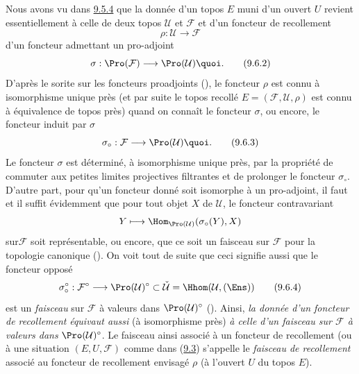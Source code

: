 Nous avons vu dans \hyperref[IV.theo9.5.4]{9.5.4} que la donnée d'un topos $E$
muni d'un ouvert $U$ revient essentiellement à celle de deux topos
$\mathcal{U}$ et $\mathcal{F}$ et d'un foncteur de recollement
\begin{equation*}
\rho:\mathcal{U}\longrightarrow \mathcal{F}\tag{9.6.1}
\end{equation*}
\ie d'un foncteur admettant un pro-adjoint
\begin{equation*}
\sigma:\Pro(\mathcal{F})\longrightarrow
\Pro(\mathcal{U}){\quoi}.\tag{9.6.2}
\end{equation*}
D'après le sorite sur les foncteurs proadjoints (), le
foncteur $\rho$ est connu à isomorphisme unique près (et par suite
le topos recollé $E=(\mathcal{F},\mathcal{U},\rho)$ est connu à
équivalence de topos près) quand on connaît le foncteur $\sigma$, ou
encore, le foncteur induit par $\sigma$
\begin{equation*}
\sigma_{\circ}:\mathcal{F}\longrightarrow
\Pro(\mathcal{U}){\quoi}.\tag{9.6.3}
\end{equation*}
Le foncteur $\sigma$ est déterminé, à isomorphisme unique près, par
la propriété de commuter aux petites limites projectives filtrantes
et de prolonger le foncteur $\sigma_\circ$. D'autre part, pour qu'un
foncteur donné  soit isomorphe à un pro-adjoint, il
faut et il suffit évidemment que pour tout objet $X$ de
$\mathcal{U}$, le foncteur contravariant
$$
Y\longmapsto \Hom_{\Pro(\mathcal{U})}(\sigma_{\circ}(Y),X)
$$
sur\pageoriginale $\mathcal{F}$ soit représentable, ou encore, que
ce soit un faisceau sur $\mathcal{F}$ pour la topologie canonique
(). On voit tout de suite que ceci
signifie aussi que le foncteur opposé
\begin{equation*}
\sigma_{\circ}^{\circ}:\mathcal{F}^{\circ}\longrightarrow
\Pro(\mathcal{U})^{\circ}\subset
\check{\mathcal{U}}=\Hhom(\mathcal{U},(\Ens))\tag{9.6.4}
\end{equation*}
est un \emph{faisceau} sur $\mathcal{F}$ à valeurs dans
$\Pro(\mathcal{U})^{\circ}$ (). Ainsi, \emph{la
donnée d'un foncteur de recollement}  \emph{équivaut
aussi} (à isomorphisme près) \emph{à celle d'un faisceau sur
$\mathcal{F}$ à valeurs dans} $\Pro(\mathcal{U})^{\circ}$. Le
faisceau ainsi associé à un foncteur de recollement (ou à une
situation $(E,U,\mathcal{F})$ comme dans (\hyperref[IV.subsec9.3]{9.3})
s'appelle le \emph{faisceau de recollement} associé au foncteur de
recollement envisagé $\rho$ (\resp à l'ouvert $U$ du topos $E$).

